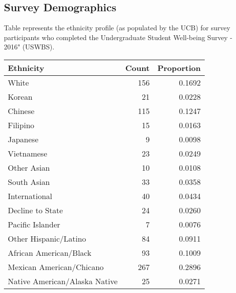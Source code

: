 \documentclass{article}\usepackage[]{graphicx}\usepackage[]{color}
\begin{document}
\newpage

\subsection{Survey Demographics}
Table represents the ethnicity profile (as populated by the UCB) for survey participants who completed the Undergraduate Student Well-being Survey - 2016" (USWBS). 
\begin{table}[ht]
\centering
\begin{tabular}{lrr}
  \hline
Ethnicity & Count & Proportion \\ 
  \hline
                         White & 156 & 0.1692 \\ 
                          Korean & 21 & 0.0228 \\ 
                         Chinese & 115 & 0.1247 \\ 
                        Filipino & 15 & 0.0163 \\ 
                        Japanese & 9 & 0.0098 \\ 
                      Vietnamese & 23 & 0.0249 \\ 
                     Other Asian & 10 & 0.0108 \\ 
                     South Asian & 33 & 0.0358 \\ 
                   International & 40 & 0.0434 \\ 
                Decline to State & 24 & 0.0260 \\ 
                Pacific Islander & 7 & 0.0076 \\ 
           Other Hispanic/Latino & 84 & 0.0911 \\ 
          African American/Black & 93 & 0.1009 \\ 
        Mexican American/Chicano & 267 & 0.2896 \\ 
   Native American/Alaska Native & 25 & 0.0271 \\ 
   \hline
\end{tabular}
\end{table}
\end{document}
